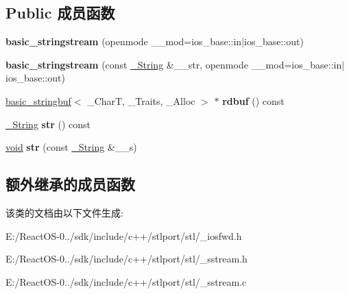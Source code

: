 \subsection*{Public 成员函数}
\begin{DoxyCompactItemize}
\item 
\mbox{\label{classbasic__stringstream_aa036707bf75678cb23f9f633f728a948}} 
{\bfseries basic\+\_\+stringstream} (openmode \+\_\+\+\_\+mod=ios\+\_\+base\+::in$\vert$ios\+\_\+base\+::out)
\item 
\mbox{\label{classbasic__stringstream_a893886fd31c8e79e2c85ef5ac1cf889d}} 
{\bfseries basic\+\_\+stringstream} (const \hyperlink{classbasic__string}{\+\_\+\+String} \&\+\_\+\+\_\+str, openmode \+\_\+\+\_\+mod=ios\+\_\+base\+::in$\vert$ios\+\_\+base\+::out)
\item 
\mbox{\label{classbasic__stringstream_a4ba7c7d8f3289a83d3c8ed42628f0523}} 
\hyperlink{classbasic__stringbuf}{basic\+\_\+stringbuf}$<$ \+\_\+\+CharT, \+\_\+\+Traits, \+\_\+\+Alloc $>$ $\ast$ {\bfseries rdbuf} () const
\item 
\mbox{\label{classbasic__stringstream_a95d40119928fa7ed74b6a4b1dd9ed7a5}} 
\hyperlink{classbasic__string}{\+\_\+\+String} {\bfseries str} () const
\item 
\mbox{\label{classbasic__stringstream_aca0de43e056f65739f1bf6d7a54053ae}} 
\hyperlink{interfacevoid}{void} {\bfseries str} (const \hyperlink{classbasic__string}{\+\_\+\+String} \&\+\_\+\+\_\+s)
\end{DoxyCompactItemize}
\subsection*{额外继承的成员函数}


该类的文档由以下文件生成\+:\begin{DoxyCompactItemize}
\item 
E\+:/\+React\+O\+S-\/0../sdk/include/c++/stlport/stl/\+\_\+iosfwd.\+h\item 
E\+:/\+React\+O\+S-\/0../sdk/include/c++/stlport/stl/\+\_\+sstream.\+h\item 
E\+:/\+React\+O\+S-\/0../sdk/include/c++/stlport/stl/\+\_\+sstream.\+c\end{DoxyCompactItemize}
